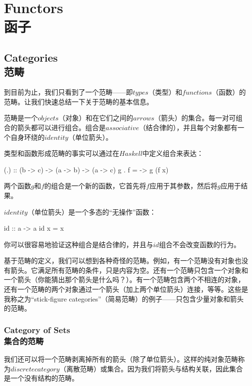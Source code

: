 \documentclass[DaoFP]{subfiles}
\begin{document}
    \setcounter{chapter}{7}

    \chapter{Functors\\函子}

    \section{Categories\\范畴}

    到目前为止，我们只看到了一个范畴——即$types$（类型）和$functions$（函数）的范畴。让我们快速总结一下关于范畴的基本信息。

    范畴是一个$objects$（对象）和在它们之间的$arrows$（箭头）的集合。每一对可组合的箭头都可以进行组合。组合是$associative$（结合律的），并且每个对象都有一个自身环绕的$identity$（单位箭头）。

    类型和函数形成范畴的事实可以通过在$Haskell$中定义组合来表达：

    \begin{haskell}
    (.) :: (b -> c) -> (a -> b) -> (a -> c)
    g . f = \x -> g (f x)
    \end{haskell}

    两个函数$g$和$f$的组合是一个新的函数，它首先将$f$应用于其参数，然后将$g$应用于结果。

    $identity$（单位箭头）是一个多态的“无操作”函数：

    \begin{haskell}
        id :: a -> a
        id x = x
    \end{haskell}

    你可以很容易地验证这种组合是结合律的，并且与$id$组合不会改变函数的行为。

    基于范畴的定义，我们可以想到各种奇怪的范畴。例如，有一个范畴没有对象也没有箭头。它满足所有范畴的条件，只是内容为空。还有一个范畴只包含一个对象和一个箭头（你能猜出那个箭头是什么吗？）。有一个范畴包含两个不相连的对象，还有一个范畴的两个对象通过一个箭头（加上两个单位箭头）连接，等等。这些是我称之为“stick-figure categories”（简易范畴）的例子——只包含少量对象和箭头的范畴。

    \subsection{Category of Sets\\集合的范畴}

    我们还可以将一个范畴剥离掉所有的箭头（除了单位箭头）。这样的纯对象范畴称为$discrete category$（离散范畴）或集合。因为我们将箭头与结构关联，因此集合是一个没有结构的范畴。
\end{document}
